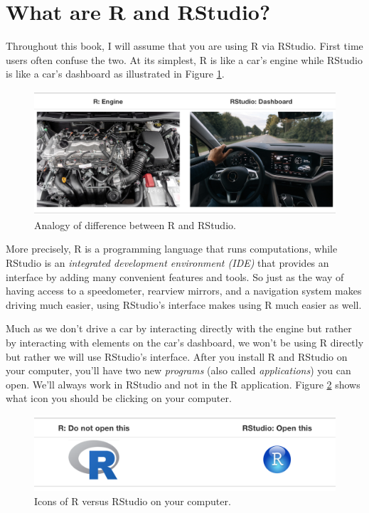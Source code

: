 \documentclass[
  12pt,
  oneside]{book}
\begin{document}
\hypertarget{r-rstudio}{%
\section{What are R and RStudio?}\label{r-rstudio}}

Throughout this book, I will assume that you are using R via RStudio. First time users often confuse the two. At its simplest, R is like a car's engine while RStudio is like a car's dashboard as illustrated in Figure \ref{fig:R-vs-RStudio-1}.

\begin{figure}
\includegraphics[width=0.95\linewidth]{fig/R_vs_RStudio_1} \caption{Analogy of difference between R and RStudio.}\label{fig:R-vs-RStudio-1}
\end{figure}

More precisely, R is a programming language that runs computations, while RStudio is an \emph{integrated development environment (IDE)} that provides an interface by adding many convenient features and tools. So just as the way of having access to a speedometer, rearview mirrors, and a navigation system makes driving much easier, using RStudio's interface makes using R much easier as well.

Much as we don't drive a car by interacting directly with the engine but rather by interacting with elements on the car's dashboard, we won't be using R directly but rather we will use RStudio's interface. After you install R and RStudio on your computer, you'll have two new \emph{programs} (also called \emph{applications}) you can open. We'll always work in RStudio and not in the R application. Figure \ref{fig:R-vs-RStudio-2a} shows what icon you should be clicking on your computer.

\begin{figure}
\includegraphics[width=0.9\linewidth]{fig/R_vs_RStudio} \caption{Icons of R versus RStudio on your computer.}\label{fig:R-vs-RStudio-2a}
\end{figure}
\end{document}
